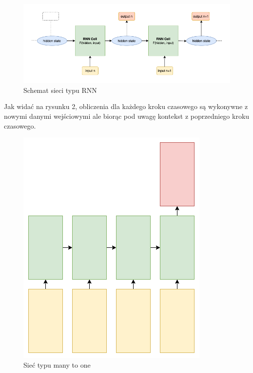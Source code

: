 \begin{figure}[!ht]
\includegraphics[width=\linewidth]{./images/rnn.png}
\caption{Schemat sieci typu RNN}
\label{fig:test3}
\end{figure}
Jak widać na rysunku 2, obliczenia dla każdego kroku czasowego są wykonywne z nowymi danymi wejściowymi
ale biorąc pod uwagę kontekst z poprzedniego kroku czasowego. 
\begin{figure}
\vspace{-4mm}
\includegraphics[width=\linewidth]{./images/many-to-one.png}
\caption{Sieć typu many to one}
\label{fig:test3}
\vspace{-4mm}
\end{figure}
